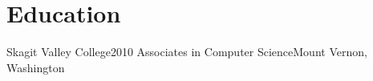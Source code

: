 \section{Education}
    \resumeSubHeadingListStart

    \resumeSubheading
    {Skagit Valley College}{2010}
    {Associates in Computer Science}{Mount Vernon, Washington}
    \resumeSubHeadingListEnd

